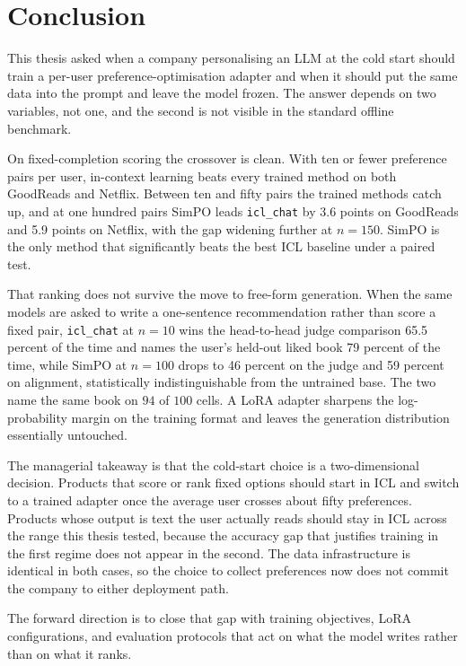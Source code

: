 
\section{Conclusion}
\label{sec:conclusion}

This thesis asked when a company personalising an LLM at the cold start should train a per-user preference-optimisation adapter and when it should put the same data into the prompt and leave the model frozen. The answer depends on two variables, not one, and the second is not visible in the standard offline benchmark.

On fixed-completion scoring the crossover is clean. With ten or fewer preference pairs per user, in-context learning beats every trained method on both GoodReads and Netflix. Between ten and fifty pairs the trained methods catch up, and at one hundred pairs SimPO leads \texttt{icl\_chat} by 3.6 points on GoodReads and 5.9 points on Netflix, with the gap widening further at $n = 150$. SimPO is the only method that significantly beats the best ICL baseline under a paired test.

That ranking does not survive the move to free-form generation. When the same models are asked to write a one-sentence recommendation rather than score a fixed pair, \texttt{icl\_chat} at $n = 10$ wins the head-to-head judge comparison 65.5 percent of the time and names the user's held-out liked book 79 percent of the time, while SimPO at $n = 100$ drops to 46 percent on the judge and 59 percent on alignment, statistically indistinguishable from the untrained base. The two name the same book on $94$ of $100$ cells. A LoRA adapter sharpens the log-probability margin on the training format and leaves the generation distribution essentially untouched.

The managerial takeaway is that the cold-start choice is a two-dimensional decision. Products that score or rank fixed options should start in ICL and switch to a trained adapter once the average user crosses about fifty preferences. Products whose output is text the user actually reads should stay in ICL across the range this thesis tested, because the accuracy gap that justifies training in the first regime does not appear in the second. The data infrastructure is identical in both cases, so the choice to collect preferences now does not commit the company to either deployment path.

The forward direction is to close that gap with training objectives, LoRA configurations, and evaluation protocols that act on what the model writes rather than on what it ranks.